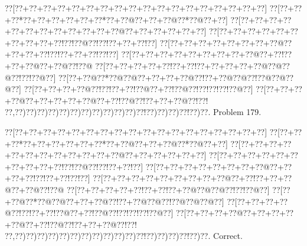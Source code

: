\documentclass[a5paper]{article}
\begin{document}
\begin{center}
{\goo
\0??[\0??+\0??+\0??+\0??+\0??+\0??+\0??+\0??+\0??+\0??+\0??+\0??+\0??+\0??+\0??+\0??+\0??+\0??]
\0??[\0??+\0??+\0??*\0??+\0??+\0??+\0??+\0??+\0??*\0??+\0??@\0??+\0??+\0??@\0??*\0??@\0??+\0??]
\0??[\0??+\0??+\0??+\0??+\0??+\0??+\0??+\0??+\0??+\0??+\0??+\0??@\0??+\0??+\0??+\0??+\0??+\0??]
\0??[\0??+\0??+\0??+\0??+\0??+\0??+\0??+\0??+\0??+\0??!\0??!\0??@\0??!\0??!\0??+\0??+\0??!\0??]
\0??[\0??+\0??+\0??+\0??+\0??+\0??+\0??+\0??@\0??+\0??+\0??+\0??!\0??!\0??+\0??+\0??!\0??!\0??]
\0??[\0??+\0??+\0??+\0??+\0??+\0??+\0??+\0??+\0??@\0??+\0??!\0??+\0??+\0??@\0??+\0??@\0??!\0??@
\0??[\0??+\0??+\0??+\0??+\0??!\0??+\0??!\0??+\0??+\0??+\0??+\0??@\0??@\0??@\0??!\0??!\0??@\0??]
\0??[\0??+\0??@\0??*\0??@\0??@\0??+\0??+\0??+\0??@\0??!\0??+\0??@\0??@\0??!\0??@\0??@\0??@\0??]
\0??[\0??+\0??+\0??+\0??@\0??!\0??!\0??+\0??!\0??@\0??+\0??!\0??@\0??!\0??!\0??!\0??!\0??@\0??]
\0??[\0??+\0??+\0??+\0??@\0??+\0??+\0??+\0??+\0??@\0??+\0??!\0??@\0??!\0??+\0??+\0??@\0??!\0??!
\0??,\0??)\0??)\0??)\0??)\0??)\0??)\0??)\0??)\0??)\0??)\0??)\0??!\0??)\0??)\0??)\0??!\0??)\0??.
}
Problem 179.

\end{center}
\begin{center}
{\goo
\0??[\0??+\0??+\0??+\0??+\0??+\0??+\0??+\0??+\0??+\0??+\0??+\0??+\0??+\0??+\0??+\0??+\0??+\0??]
\0??[\0??+\0??+\0??*\0??+\0??+\0??+\0??+\0??+\0??*\0??+\0??@\0??+\0??+\0??@\0??*\0??@\0??+\0??]
\0??[\0??+\0??+\0??+\0??+\0??+\0??+\0??+\0??+\0??+\0??+\0??+\0??@\0??+\0??+\0??+\0??+\0??+\0??]
\0??[\0??+\0??+\0??+\0??+\0??+\0??+\0??+\0??+\0??+\0??!\0??!\0??@\0??!\0??!\0??+\0??!\0??]
\0??[\0??+\0??+\0??+\0??+\0??+\0??+\0??+\0??@\0??+\0??+\0??+\0??!\0??!\0??+\0??!\0??!\0??]
\0??[\0??+\0??+\0??+\0??+\0??+\0??+\0??+\0??+\0??@\0??+\0??!\0??+\0??+\0??@\0??+\0??@\0??!\0??@
\0??[\0??+\0??+\0??+\0??+\0??!\0??+\0??!\0??+\0??@\0??@\0??@\0??!\0??!\0??@\0??]
\0??[\0??+\0??@\0??*\0??@\0??@\0??+\0??+\0??@\0??!\0??+\0??@\0??@\0??!\0??@\0??@\0??@\0??]
\0??[\0??+\0??+\0??+\0??@\0??!\0??!\0??+\0??!\0??@\0??+\0??!\0??@\0??!\0??!\0??!\0??!\0??@\0??]
\0??[\0??+\0??+\0??+\0??@\0??+\0??+\0??+\0??+\0??@\0??+\0??!\0??@\0??!\0??+\0??+\0??@\0??!\0??!
\0??,\0??)\0??)\0??)\0??)\0??)\0??)\0??)\0??)\0??)\0??)\0??)\0??!\0??)\0??)\0??)\0??!\0??)\0??.
}
Correct. 

\end{center}
\end{document}
